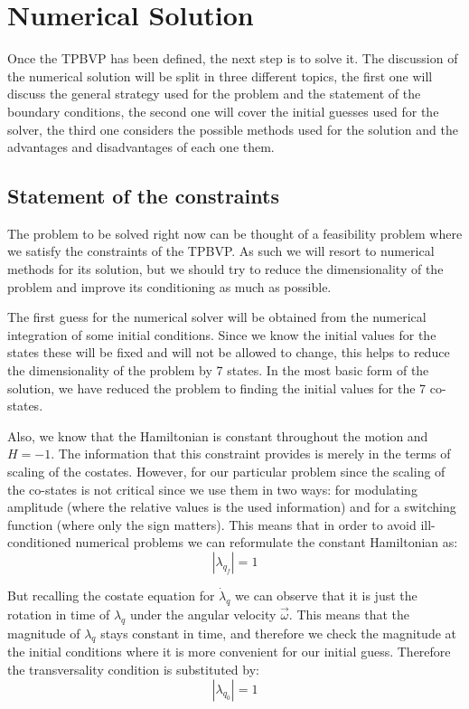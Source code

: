 \section{Numerical Solution}
Once the TPBVP has been defined, the next step is to solve it. The discussion of the numerical solution will be split in three different topics, the first one will discuss the general strategy used for the problem and the statement of the boundary conditions, the second one will cover the initial guesses used for the solver, the third one considers the possible methods used for the solution and the advantages and disadvantages of each one them.

\subsection{Statement of the constraints}
The problem to be solved right now can be thought of a feasibility problem where we satisfy the constraints of the TPBVP. As such we will resort to numerical methods for its solution, but we should try to reduce the dimensionality of the problem and improve its conditioning as much as possible.

The first guess for the numerical solver will be obtained from the numerical integration of some initial conditions. Since we know the initial values for the states these will be fixed and will not be allowed to change, this helps to reduce the dimensionality of the problem by 7 states. In the most basic form of the solution, we have reduced the problem to finding the initial values for the 7 co-states.

Also, we know that the Hamiltonian is constant throughout the motion and $H=-1$. The information that this constraint provides is merely in the terms of scaling of the costates. However, for our particular problem since the scaling of the co-states is not critical since we use them in two ways: for modulating amplitude (where the relative values is the used information) and for a switching function (where only the sign matters). This means that in order to avoid ill-conditioned numerical problems we can reformulate the constant Hamiltonian as:
\begin{equation}
|\lambda_{q_f}|=1
\end{equation}

But recalling the costate equation for $\dot{\lambda}_q$ we can observe that it is just the rotation in  time of $\lambda_q$ under the angular velocity $\vec{\omega}$. This means that the magnitude of $\lambda_q$ stays constant in time, and therefore we check the magnitude at the initial conditions where it is more convenient for our initial guess. Therefore the transversality condition is substituted by:
\begin{equation}
|\lambda_{q_0}|=1
\end{equation}

